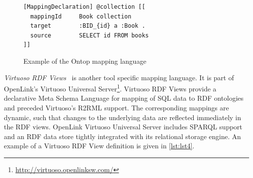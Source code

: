 

\begin{figure}[!h]
\centering
\begin{verbatim}
[MappingDeclaration] @collection [[
  mappingId     Book collection
  target        :BID_{id} a :Book .
  source        SELECT id FROM books
]]
\end{verbatim}
\caption{Example of the Ontop mapping language}
\label{lst:lst3}
\end{figure}


\emph{Virtuoso RDF Views}~\cite{virtuosoRdfViews} is another tool specific mapping language.
It is part of OpenLink's Virtuoso Universal Server\footnote{\url{http://virtuoso.openlinksw.com/}}.
Virtuoso RDF Views provide a declarative Meta Schema Language for mapping of SQL data to RDF ontologies and preceded Virtuoso's R2RML support.
The corresponding mappings are dynamic, such that changes to the underlying data are reflected immediately in the RDF views.
OpenLink Virtuoso Universal Server includes SPARQL support and an RDF data store tightly integrated with its relational storage engine.
An example of a Virtuoso RDF View definition is given in \autoref{lst:lst4}.



